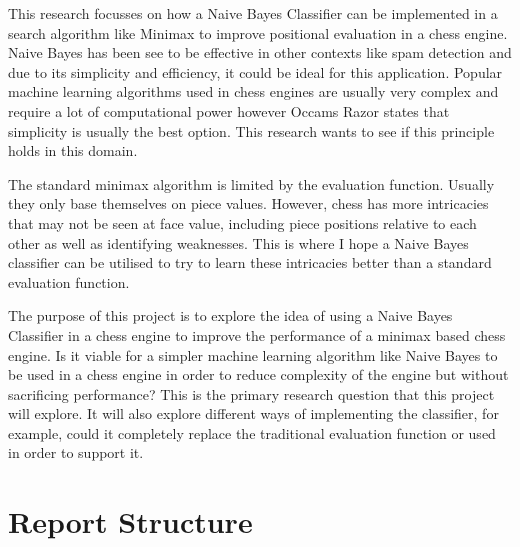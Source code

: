 \documentclass[20pt]{informatics-report}
\begin{document}
This research focusses on how a Naive Bayes Classifier can be implemented in a search algorithm like Minimax to improve positional evaluation in a chess engine. Naive Bayes has been see to be effective in other contexts like spam detection and due to its simplicity and efficiency, it could be ideal for this application. Popular machine learning algorithms used in chess engines are usually very complex and require a lot of computational power however Occams Razor states that simplicity is usually the best option. This research wants to see if this principle holds in this domain. 

The standard minimax algorithm is limited by the evaluation function. Usually they only base themselves on piece values. However, chess has more intricacies that may not be seen at face value, including piece positions relative to each other as well as identifying weaknesses. This is where I hope a Naive Bayes classifier can be utilised to try to learn these intricacies better than a standard evaluation function.

The purpose of this project is to explore the idea of using a Naive Bayes Classifier in a chess engine to improve the performance of a minimax based chess engine. Is it viable for a simpler machine learning algorithm like Naive Bayes to be used in a chess engine in order to reduce complexity of the engine but without sacrificing performance? This is the primary research question that this project will explore. It will also explore different ways of implementing the classifier, for example, could it completely replace the traditional evaluation function or used in order to support it.




\section{Report Structure}
















\appendix



\end{document}
